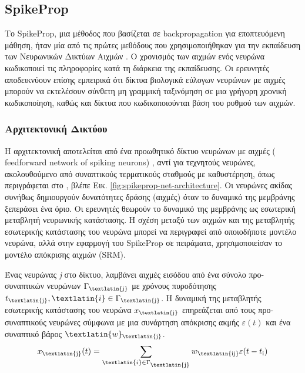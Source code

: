 \documentclass[12pt]{report}
\begin{document}
\subsection{\textlatin{SpikeProp}}

Το \textlatin{SpikeProp}, μια μέθοδος που βασίζεται σε \textlatin{backpropagation} για εποπτευόμενη μάθηση, ήταν μία από τις πρώτες μεθόδους που χρησιμοποιήθηκαν για την εκπαίδευση των Νευρωνικών Δικτύων Αιχμών \cite{bohte2002}. Ο χρονισμός των αιχμών ενός νευρώνα κωδικοποιεί τις πληροφορίες κατά τη διάρκεια της εκπαίδευσης. Οι ερευνητές αποδεικνύουν επίσης εμπειρικά ότι δίκτυα βιολογικά εύλογων νευρώνων με αιχμές μπορούν να εκτελέσουν σύνθετη μη γραμμική ταξινόμηση σε μια γρήγορη χρονική κωδικοποίηση, καθώς και δίκτυα που κωδικοποιούνται βάση του ρυθμού των αιχμών.
\subsubsection{Αρχιτεκτονική Δικτύου}
Η αρχιτεκτονική αποτελείται από ένα προωθητικό δίκτυο νευρώνων με αιχμές (\textlatin{ feedforward network of spiking neurons}) , αντί για τεχνητούς νευρώνες, ακολουθούμενο από συναπτικούς τερματικούς σταθμούς με καθυστέρηση, όπως περιγράφεται στο \cite{ruf1998}, βλέπε Εικ. \ref{fig:spikeprop-net-architecture}. Οι νευρώνες ακίδας συνήθως δημιουργούν δυνατότητες δράσης (αιχμές) όταν το δυναμικό της μεμβράνης ξεπεράσει ένα όριο. Οι ερευνητές θεωρούν το δυναμικό της μεμβράνης ως εσωτερική μεταβλητή νευρωνικής κατάστασης. Η σχέση μεταξύ των αιχμών και της μεταβλητής εσωτερικής κατάστασης του νευρώνα μπορεί να περιγραφεί από οποιοδήποτε μοντέλο νευρώνα, αλλά στην εφαρμογή του \textlatin{SpikeProp} σε πειράματα, χρησιμοποιείσαν το μοντέλο απόκρισης αιχμών (\textlatin{SRM}).

Ένας νευρώνας \textit{\textlatin{j}} στο δίκτυο, λαμβάνει αιχμές εισόδου από ένα σύνολο προ-συναπτικών νευρώνων \(\Gamma\textsubscript{\textlatin{j}}\) με χρόνους πυροδότησης \(t\textsubscript{\textlatin{j}},\textlatin{i}\in\Gamma\textsubscript{\textlatin{j}}\). Η δυναμική της μεταβλητής εσωτερικής κατάστασης του νευρώνα \(x\textsubscript{\textlatin{j}}\) επηρεάζεται από τους προ-συναπτικούς νευρώνες σύμφωνα με μια συνάρτηση απόκρισης ακμής \(\varepsilon(t)\) και ένα συναπτικό βάρος \(\textlatin{w}\textsubscript{\textlatin{j}}\).
\begin{equation}
    x\textsubscript{\textlatin{j}}(t) = \sum_{\textlatin{i}\in\Gamma\textsubscript{\textlatin{j}}} w\textsubscript{\textlatin{ij}}\varepsilon(t-t\textsubscript{i})
\end{equation}
\end{document}

